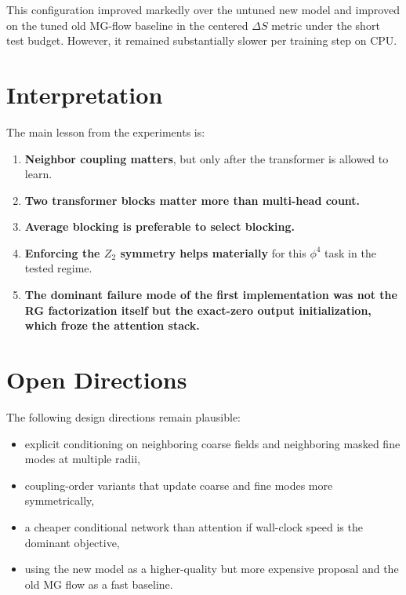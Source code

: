 \documentclass[11pt]{article}
\begin{document}
This configuration improved markedly over the untuned new model and improved on
the tuned old MG-flow baseline in the centered $\Delta S$ metric under the
short test budget. However, it remained substantially slower per training step
on CPU.

\section{Interpretation}

The main lesson from the experiments is:
\begin{enumerate}
\item \textbf{Neighbor coupling matters}, but only after the transformer is
allowed to learn.
\item \textbf{Two transformer blocks matter more than multi-head count.}
\item \textbf{Average blocking is preferable to select blocking.}
\item \textbf{Enforcing the $Z_2$ symmetry helps materially} for this $\phi^4$
task in the tested regime.
\item \textbf{The dominant failure mode of the first implementation was not the
RG factorization itself but the exact-zero output initialization, which froze
the attention stack.}
\end{enumerate}

\section{Open Directions}

The following design directions remain plausible:
\begin{itemize}
\item explicit conditioning on neighboring coarse fields and neighboring masked
fine modes at multiple radii,
\item coupling-order variants that update coarse and fine modes more
symmetrically,
\item a cheaper conditional network than attention if wall-clock speed is the
dominant objective,
\item using the new model as a higher-quality but more expensive proposal and
the old MG flow as a fast baseline.
\end{itemize}
\end{document}
